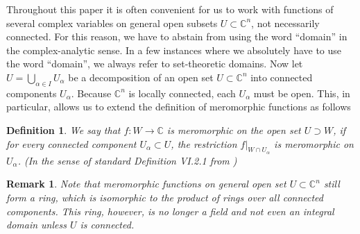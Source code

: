 \documentclass{amsart}
\newtheorem{definition}[theorem]{Definition}
\newtheorem{remark}[theorem]{Remark}
\begin{document}
Throughout this paper it is often convenient for us to work with functions of several complex variables on general open subsets $U\subset\mathbb C^n$, not necessarily connected. For this reason, we have to abstain from using the word ``domain'' in the complex-analytic sense. In a few instances where we absolutely have to use the word ``domain'', we always refer to set-theoretic domains. Now let $U=\bigcup_{\alpha\in I} U_\alpha$ be a decomposition of an open set $U\subset\mathbb C^n$ into connected components $U_\alpha$. Because $\mathbb C^n$ is locally connected, each $U_\alpha$ must be open. This, in particular, allows us to extend the definition of meromorphic functions as follows
\begin{definition} We say that $f:W\rightarrow\mathbb C$ is meromorphic on the open set $U\supset W$, if for every connected component $U_\alpha\subset U$, the restriction $f|_{W\cap U_\alpha}$ is meromorphic on $U_\alpha$. (In the sense of standard Definition VI.2.1 from \cite{FischerLieb'2012})
\end{definition}

\begin{remark}
Note that meromorphic functions on general open set $U\subset\mathbb C^n$ still form a ring, which is isomorphic to the product of rings over all connected components. This ring, however, is no longer a field and not even an integral domain unless $U$ is connected.
\end{remark}
\end{document}
